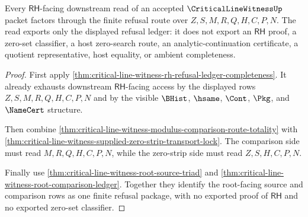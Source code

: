 \begin{theorem}
\label{thm:critical-line-witness-rh-refusal-nonescape}
Every $\mathsf{RH}$-facing downstream read of an accepted $\CriticalLineWitnessUp$ packet factors through the finite refusal route over $Z,S,M,R,Q,H,C,P,N$. The read exports only the displayed refusal ledger: it does not export an $\mathsf{RH}$ proof, a zero-set classifier, a host zero-search route, an analytic-continuation certificate, a quotient representative, host equality, or ambient completeness.
\end{theorem}
\begin{proof}
First apply \autoref{thm:critical-line-witness-rh-refusal-ledger-completeness}. It already exhausts downstream $\mathsf{RH}$-facing access by the displayed rows $Z,S,M,R,Q,H,C,P,N$ and by the visible $\BHist$, $\hsame$, $\Cont$, $\Pkg$, and $\NameCert$ structure.

Then combine \autoref{thm:critical-line-witness-modulus-comparison-route-totality} with \autoref{thm:critical-line-witness-supplied-zero-strip-transport-lock}. The comparison side must read $M,R,Q,H,C,P,N$, while the zero-strip side must read $Z,S,H,C,P,N$.

Finally use \autoref{thm:critical-line-witness-root-source-triad} and \autoref{thm:critical-line-witness-root-comparison-ledger}. Together they identify the root-facing source and comparison rows as one finite refusal package, with no exported proof of $\mathsf{RH}$ and no exported zero-set classifier.
\end{proof}

